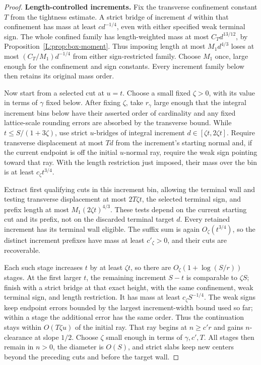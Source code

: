 \documentclass[11pt]{article}
\numberwithin{equation}{section}
\theoremstyle{definition}\newtheorem{definition}[theorem]{Definition}
\theoremstyle{remark}\newtheorem{remark}[theorem]{Remark}
\begin{document}
\begin{proof}
\smallskip\noindent\textbf{Length-controlled increments.}
Fix the transverse confinement constant \(T\) from the tightness
estimate. A strict bridge of increment \(d\) within that confinement
has mass at least \(cd^{-1/4}\), even with either specified weak
terminal sign. The whole confined family has length-weighted mass
at most \(C_Td^{13/12}\), by Proposition~\ref{L:prop:box-moment}.
Thus imposing length at most \(M_1d^{4/3}\) loses at most
\((C_T/M_1)d^{-1/4}\) from either sign-restricted family. Choose
\(M_1\) once, large enough for the confinement and sign constants.
Every increment family below then retains its original mass order.

Now start from a selected cut at \(u=t\). Choose a small fixed
\(\zeta>0\), with its value in terms of \(\gamma\) fixed below.
After fixing \(\zeta\), take \(r_\gamma\) large enough that the integral
increment bins below have their asserted order of cardinality and any
fixed lattice-scale rounding errors are absorbed by the transverse bound.
While \(t\le S/(1+3\zeta)\), use strict \(u\)-bridges
of integral increment \(d\in[\zeta t,2\zeta t]\). Require transverse
displacement at most \(Td\) from the increment's starting normal and,
if the current endpoint is off the initial \(u\)-normal ray, require
the weak sign pointing toward that ray. With the length restriction
just imposed, their mass over the bin is at least
\(c_\zeta t^{3/4}\).

Extract first qualifying cuts in this increment bin, allowing the
terminal wall and testing
transverse displacement at most \(2T\zeta t\), the selected terminal
sign, and prefix length at most \(M_1(2\zeta t)^{4/3}\).
These tests depend on the current starting cut and its prefix, not on
the discarded terminal target \(d\). Every retained increment has
its terminal wall eligible. The suffix sum is again
\(O_\zeta(t^{3/4})\), so the distinct increment prefixes have mass
at least \(c'_\zeta>0\), and their cuts are recoverable.

Each such stage increases \(t\) by at least \(\zeta t\), so there are
\(O_\zeta(1+\log(S/r))\) stages. At the first larger \(t\), the
remaining increment \(S-t\) is comparable to \(\zeta S\); finish
with a strict bridge at that exact height, with the same confinement,
weak terminal sign, and length restriction. It has mass at least
\(c_\zeta S^{-1/4}\). The weak signs keep endpoint errors bounded
by the largest increment-width bound used so far; within a stage the
additional error has the same order. Thus the continuation stays
within \(O(T\zeta u)\) of the initial ray. That ray begins at
\(n\ge c'r\) and gains \(n\)-clearance at slope \(1/2\).
Choose \(\zeta\) small enough in terms of \(\gamma,c',T\).
All stages then remain in \(n>0\), the diameter is \(O(S)\),
and strict slabs keep new centers beyond the preceding cuts and
before the target wall.


\end{proof}
\end{document}
